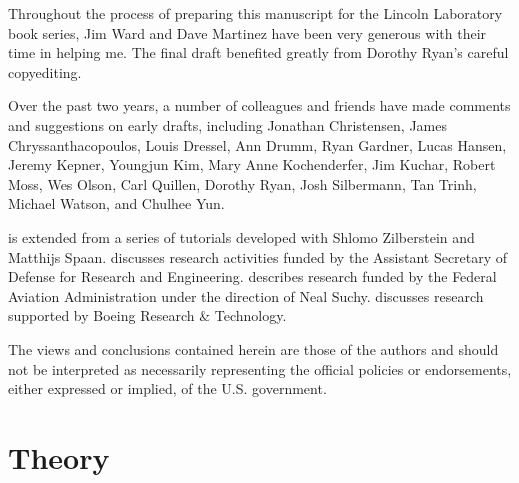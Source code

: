 \documentclass[dvipdfmx,uplatex,useotf]{dmubookJ}
\begin{document}
\begin{acknowledgments}
Throughout the process of preparing this manuscript for the Lincoln Laboratory book series, Jim Ward and Dave Martinez have been very generous with their time in helping me. The final draft benefited greatly from Dorothy Ryan's careful copyediting.


Over the past two years, a number of colleagues and friends have made comments and suggestions on early drafts, including Jonathan Christensen, James Chryssanthacopoulos, Louis Dressel, Ann Drumm, Ryan Gardner, Lucas Hansen, Jeremy Kepner, Youngjun Kim, Mary Anne Kochenderfer, Jim Kuchar, Robert Moss, Wes Olson, Carl Quillen, Dorothy Ryan, Josh Silbermann, Tan Trinh, Michael Watson, and Chulhee Yun.

 is extended from a series of tutorials developed with Shlomo Zilberstein and Matthijs Spaan.  discusses research activities funded by the Assistant Secretary of Defense for Research and Engineering.  describes research funded by the Federal Aviation Administration under the direction of Neal Suchy.  discusses research supported by Boeing Research \& Technology. 

The views and conclusions contained herein are those of the authors and should not be interpreted as necessarily representing the official policies or endorsements, either expressed or implied, of the U.S. government.
\end{acknowledgments}


\part{Theory}
\end{document}
